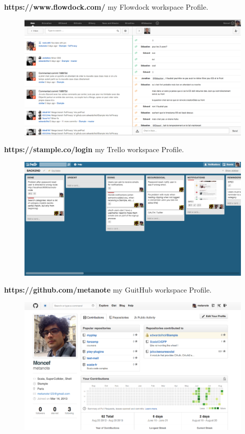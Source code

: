\documentclass[11pt]{article} %
\begin{document}
\textbf{https://www.flowdock.com/} my Flowdock workspace Profile.
\begin{figure}[H]
        \centering
                \centering
                \includegraphics[width=\textwidth]{Flowdock.png}
               
\end{figure}
\newpage
\textbf{https://stample.co/login} my Trello workspace Profile.
\begin{figure}[H]
        \centering
                \centering
                \includegraphics[width=\textwidth]{trello.png}
               
\end{figure}
\textbf{https://github.com/metanote} my GuitHub workspace Profile.
\begin{figure}[H]
        \centering
                \centering
                \includegraphics[width=\textwidth]{gitProfile.png}
               
\end{figure}
\end{document}
